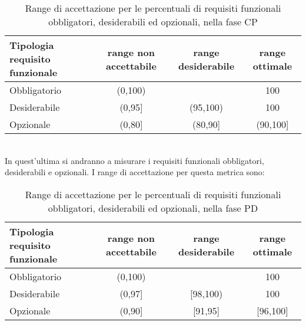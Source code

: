 \begin{description}
							\begin{table}[H]
								\centering
									\begin{tabu}{| l | c | c | c |}\hline
										Tipologia requisito funzionale	&	range non accettabile & range desiderabile & range ottimale \\ \hline	\hline

										Obbligatorio	&	(0,100) &  &  100 \\ \hline
										Desiderabile	&  (0,95]& (95,100) & 100 \\ \hline
										Opzionale		&  (0,80]& (80,90] & (90,100] \\ \hline
									\end{tabu}
									\caption{Range di accettazione per le percentuali di requisiti funzionali obbligatori, desiderabili ed opzionali, nella fase CP}
							\end{table}

						\item[\insphase{Fase PD}] \hfill \\
						In quest'ultima  si andranno a misurare i requisiti funzionali obbligatori, desiderabili e opzionali. I range di accettazione per questa metrica sono:

						\begin{table}[H]
							\centering
								\begin{tabu}{| l | c | c | c |}\hline
									Tipologia requisito funzionale	&	range non accettabile & range desiderabile & range ottimale \\ \hline	\hline

									Obbligatorio	&	(0,100) &  &  100 \\ \hline
									Desiderabile	&  (0,97]& [98,100) & 100 \\ \hline
									Opzionale		&  (0,90]& [91,95] & [96,100] \\ \hline
								\end{tabu}
								\caption{Range di accettazione per le percentuali di requisiti funzionali obbligatori, desiderabili ed opzionali, nella fase PD}
						\end{table}
					\end{description}

